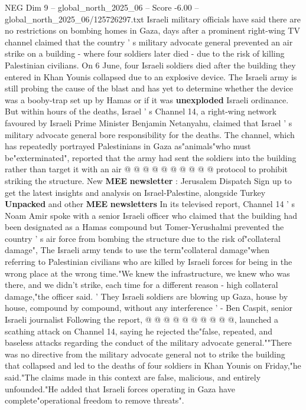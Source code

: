 \begin{textsample}{NEG Dim 9 – global\_north\_2025\_06 – Score -6.00 – global\_north\_2025\_06/125726297.txt}  \label{ex:f9_neg_082}
Israeli military officials have said there are no restrictions on bombing homes in Gaza, days after a prominent right-wing TV channel claimed that the country ' s military advocate general prevented an air strike on a building - where four soldiers later died - due to the risk of killing Palestinian civilians.
On 6 June, four Israeli soldiers died after the building they entered in Khan Younis collapsed due to an explosive device.
The Israeli army is still probing the cause of the blast and has yet to determine whether the device was a booby-trap set up by Hamas or if it was \textbf{unexploded} Israeli ordinance.
But within hours of the deaths, Israel ' s Channel 14, a right-wing network favoured by Israeli Prime Minister Benjamin Netanyahu, claimed that Israel ' s military advocate general bore responsibility for the deaths.
The channel, which has repeatedly portrayed Palestinians in Gaza as"animals"who must be"exterminated", reported that the army had sent the soldiers into the building rather than target it with an air @ @ @ @ @ @ @ @ @ @ protocol to prohibit striking the structure.
New \textbf{MEE} \textbf{newsletter} : Jerusalem Dispatch Sign up to get the latest insights and analysis on Israel-Palestine, alongside Turkey \textbf{Unpacked} and other \textbf{MEE} \textbf{newsletters} In its televised report, Channel 14 ' s Noam Amir spoke with a senior Israeli officer who claimed that the building had been designated as a Hamas compound but Tomer-Yerushalmi prevented the country ' s air force from bombing the structure due to the risk of"collateral damage", The Israeli army tends to use the term"collateral damage"when referring to Palestinian civilians who are killed by Israeli forces for being in the wrong place at the wrong time."We knew the infrastructure, we knew who was there, and we didn't strike, each time for a different reason - high collateral damage,"the officer said. ' They Israeli soldiers are blowing up Gaza, house by house, compound by compound, without any interference ' - Ben Caspit, senior Israeli journalist Following the report, @ @ @ @ @ @ @ @ @ @, launched a scathing attack on Channel 14, saying he rejected the"false, repeated, and baseless attacks regarding the conduct of the military advocate general.""There was no directive from the military advocate general not to strike the building that collapsed and led to the deaths of four soldiers in Khan Younis on Friday,"he said."The claims made in this context are false, malicious, and entirely unfounded."He added that Israeli forces operating in Gaza have complete"operational freedom to remove threats".

\end{textsample}
